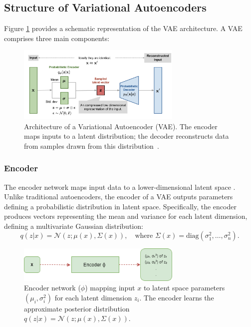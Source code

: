 \subsection{Structure of Variational Autoencoders}
Figure \ref{fig:vae_structure} provides a schematic representation of the VAE architecture. A VAE comprises three main components:

\begin{figure}[htbp]
\centering
\includegraphics[width=0.7\textwidth]{img/vae/vae-gaussian.png}
\caption{Architecture of a Variational Autoencoder (VAE). The encoder maps inputs to a latent distribution; the decoder reconstructs data from samples drawn from this distribution~\cite{weng2018VAE}.}
\label{fig:vae_structure}
\end{figure}

\subsubsection{Encoder}
The encoder network maps input data  to a lower-dimensional latent space . Unlike traditional autoencoders, the encoder of a VAE outputs parameters defining a probabilistic distribution in latent space. Specifically, the encoder produces vectors representing the mean  and variance  for each latent dimension, defining a multivariate Gaussian distribution:
\begin{equation}
q(z|x) = \mathcal{N}(z; \mu(x), \Sigma(x)), \quad \text{where } \Sigma(x) = \text{diag}(\sigma_1^2, \dots, \sigma_n^2).
\end{equation}
\begin{figure}[htbp]
    \centering
    \includegraphics[width=0.7\textwidth]{img/vae/Image To Encoder To Latent Variable Parameters.png}
    \caption{Encoder network ($\phi$) mapping input $x$ to latent space parameters $(\mu_i, \sigma_i^2)$ for each latent dimension $z_i$. The encoder learns the approximate posterior distribution $q(z|x) = \mathcal{N}(z; \mu(x), \Sigma(x))$.}
    \label{fig:encoder}
\end{figure}

